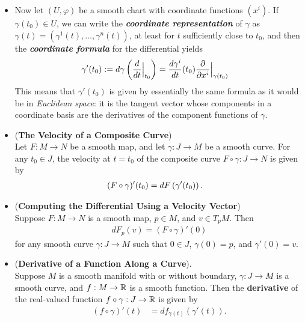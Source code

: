 \documentclass[11pt]{article}
\begin{document}
\begin{itemize}
\item \begin{remark}
Now let $(U, \varphi)$ be a smooth chart with coordinate functions $(x^i)$. If $\gamma(t_0) \in U$, we can write the \emph{\textbf{coordinate representation}} of $\gamma$ as $\gamma(t) = (\gamma^1(t), \ldots, \gamma^{n}(t))$, at least for $t$ sufficiently close to $t_0$, and then the \textbf{\emph{coordinate formula}} for the differential yields
\begin{align}
\gamma'(t_0) := d\gamma\left(\frac{d}{dt}\Bigr|_{t_0}\right) &= \frac{d\gamma^{i}}{dt}(t_0)\frac{\partial }{ \partial x^{i}}\Bigr|_{\gamma(t_0)} \label{eqn: curve_coordinate}
\end{align} This means that $\gamma'(t_0)$ is given by essentially the same formula as it would be in \emph{Euclidean space}: it is the tangent vector whose components in a coordinate basis are the derivatives of the component functions of $\gamma$.
\end{remark}

\item \begin{proposition} (\textbf{The Velocity of a Composite Curve}) \citep{lee2003introduction}\\
 Let $F: M \rightarrow N$ be a smooth map, and let $\gamma: J \rightarrow M$ be a smooth curve. For any $t_0 \in J$, the velocity at $t = t_0$ of the composite curve $F \circ \gamma: J \rightarrow N$ is given by
\begin{align}
(F\circ \gamma)'(t_0) &= dF\left(\gamma'(t_0)\right). \label{eqn: curve_composite}
\end{align}
\end{proposition}

\item \begin{corollary} (\textbf{Computing the Differential Using a Velocity Vector}) \citep{lee2003introduction} \\
Suppose $F: M \rightarrow N$ is a smooth map, $p \in M$, and $v \in T_{p}M$. Then
\begin{align}
dF_{p}(v) = (F \circ \gamma)'(0) \label{eqn: differential_via_curve}
\end{align} for any smooth curve $\gamma: J \rightarrow M$ such that $0 \in J$, $\gamma(0) = p$, and $\gamma'(0) = v$.
\end{corollary} 

\item \begin{proposition}(\textbf{Derivative of a Function Along a Curve}). \\
Suppose $M$ is a smooth manifold with or without boundary, $\gamma:  J \rightarrow M$ is a smooth curve, and $f: M \rightarrow {\mathbb R}$ is a smooth function. Then the \textbf{derivative} of the real-valued function $f \circ \gamma:  J \rightarrow {\mathbb R}$ is given by
\begin{align}
(f \circ  \gamma)'(t) &=  df_{\gamma(t)}(\gamma'(t)). \label{eqn: differential_rate_of_change_curve}
\end{align}
\end{proposition}


\end{itemize}
\end{document}
